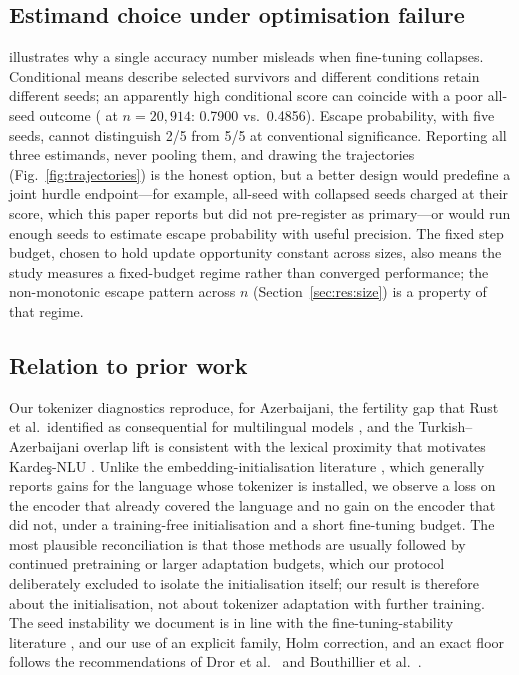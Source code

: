 \subsection{Estimand choice under optimisation failure}
\xlmxv{} illustrates why a single accuracy number misleads when fine-tuning collapses. Conditional means describe selected survivors and different conditions retain different seeds; an apparently high conditional score can coincide with a poor all-seed outcome (\OMP{} at $n=20{,}914$: 0.7900 vs.\ 0.4856). Escape probability, with five seeds, cannot distinguish 2/5 from 5/5 at conventional significance. Reporting all three estimands, never pooling them, and drawing the trajectories (Fig.~\ref{fig:trajectories}) is the honest option, but a better design would predefine a joint hurdle endpoint---for example, all-seed \Fone{} with collapsed seeds charged at their score, which this paper reports but did not pre-register as primary---or would run enough seeds to estimate escape probability with useful precision. The fixed step budget, chosen to hold update opportunity constant across sizes, also means the study measures a fixed-budget regime rather than converged performance; the non-monotonic escape pattern across $n$ (Section~\ref{sec:res:size}) is a property of that regime.

\subsection{Relation to prior work}
Our tokenizer diagnostics reproduce, for Azerbaijani, the fertility gap that Rust et al.\ identified as consequential for multilingual models \cite{rust2021tokenizer}, and the Turkish–Azerbaijani overlap lift is consistent with the lexical proximity that motivates Kardeş-NLU \cite{senel2024kardes}. Unlike the embedding-initialisation literature \cite{minixhofer2022wechsel,dobler2023focus,minixhofer2024zett,goddard2025omp}, which generally reports gains for the language whose tokenizer is installed, we observe a loss on the encoder that already covered the language and no gain on the encoder that did not, under a training-free initialisation and a short fine-tuning budget. The most plausible reconciliation is that those methods are usually followed by continued pretraining or larger adaptation budgets, which our protocol deliberately excluded to isolate the initialisation itself; our result is therefore about the initialisation, not about tokenizer adaptation with further training. The seed instability we document is in line with the fine-tuning-stability literature \cite{dodge2020finetuning,mosbach2021stability}, and our use of an explicit family, Holm correction, and an exact floor follows the recommendations of Dror et al.\ \cite{dror2018hitchhiker} and Bouthillier et al.\ \cite{bouthillier2021variance}.

